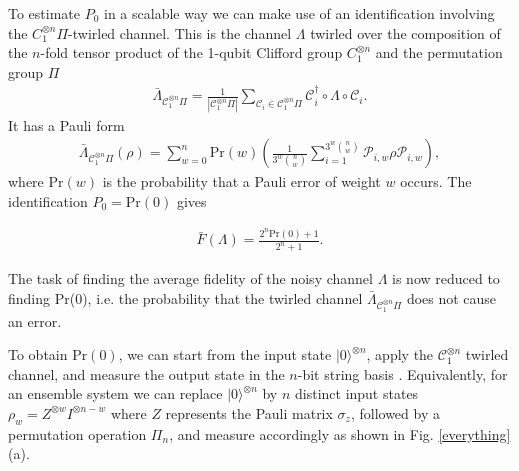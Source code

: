\documentclass[prl,twocolumn,showpacs]{revtex4-1}
\newcommand{\ket}[1]{|#1\rangle}
\begin{document}
To estimate $P_0$ in a scalable  way  we can make use of an identification involving  the $C_1^{\otimes n} \Pi$-twirled channel. This is the channel $\Lambda$ twirled over the composition of the $n$-fold tensor product of the 1-qubit Clifford group $C_1^{\otimes n}$ and  the  permutation group $ \Pi$
  \begin{align} \label{C1_twirl}
\bar{\Lambda}_{\mathcal{C}_1^{\otimes n}\Pi} = \frac{1}{|\mathcal{C}_1^{\otimes n}\Pi|}\sum_{\mathcal{C}_i\in \mathcal{C}_1^{\otimes n}\Pi} \mathcal{C}_i^{\dagger} \circ \Lambda \circ \mathcal{C}_i.
\end{align}
It has a Pauli form
\begin{align} \label{C1_twirlrho}
\bar{\Lambda}_{\mathcal{C}_1^{\otimes n}\Pi}(\rho) = \sum_{w=0}^n \text{Pr}(w) \left ( \frac{1}{3^w \binom{n}{w}} \sum_{i=1}^{3^w \binom{n}{w}} \mathcal{P}_{i,w} \rho \mathcal{P}_{i,w} \right ),
\end{align}
where $\text{Pr}(w)$ is the probability that a Pauli error of weight $w$ occurs.  The identification $P_0=\text{Pr}(0)$  \cite{Silva2008} gives

\begin{align} \label{fidelity_pr}
\bar{F}(\Lambda) = \frac{2^n \text{Pr}(0) +1}{2^n +1}.
\end{align}

The task of finding the average fidelity of the noisy channel $\Lambda$ is now reduced to finding Pr(0), i.e. the probability that the twirled  channel $\bar{\Lambda}_{\mathcal{C}_1^{\otimes n} \Pi}$ does not cause an error.





To obtain $\text{Pr}(0)$, we can start from the input state $\ket{0}^{\otimes n}$, apply the $\mathcal{C}_1^{\otimes n}$ twirled channel, and measure the output state in the $n$-bit string basis \cite{Emerson2007}.  Equivalently, for an ensemble system we can replace $\ket{0}^{\otimes n}$ by $n$ distinct input states $\rho_w = Z^{\otimes w}I^{\otimes n-w}$ where $Z$ represents the Pauli matrix $\sigma_z$, followed by a permutation operation $\Pi_n$, and measure accordingly as shown in Fig. \ref{everything}(a).
\end{document}
